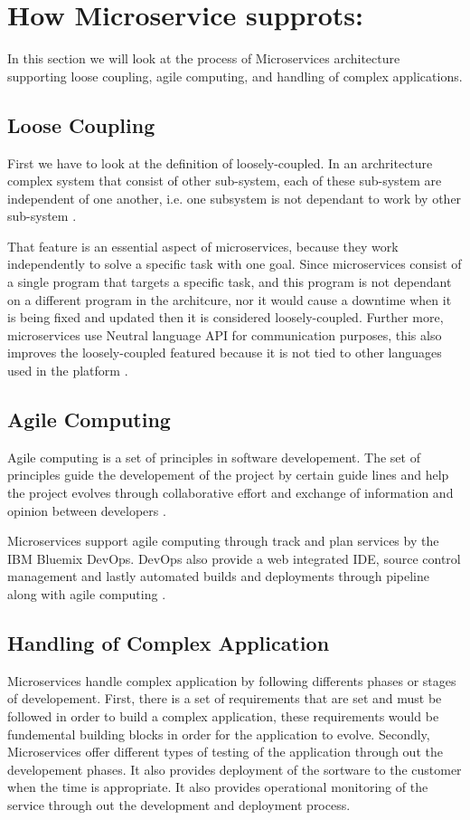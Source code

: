 \documentclass{IEEEtran}
\begin{document}
	\section{How Microservice supprots:}
		In this section we will look at the process of Microservices architecture supporting loose coupling, agile computing, and handling of complex applications.  

		\subsection{Loose Coupling}
			First we have to look at the definition of loosely-coupled. In an archritecture complex system that consist of other sub-system, each of these sub-system are independent of one another, i.e. one subsystem is not dependant to work by other sub-system \cite{mell2009effectively}. 
			\newline

			That feature is an essential aspect of microservices, because they work independently to solve a specific task with one goal. Since microservices consist of a single program that targets a specific task, and this program is not dependant on a different program in the architcure, nor it would cause a downtime when it is being fixed and updated then it is considered loosely-coupled. Further more, microservices use Neutral language API for communication purposes, this also improves the loosely-coupled featured because it is not tied to other languages used in the platform \cite{ibmred}. 
		\subsection{Agile Computing}
			Agile computing is a set of principles in software developement. The set of principles guide the developement of the project by certain guide lines and help the project evolves through collaborative effort and exchange of information and opinion between developers \cite{mell2009effectively}. 
			\newline

			Microservices support agile computing through track and plan services by the IBM Bluemix DevOps. 
			DevOps also provide a web integrated IDE, source control management and lastly automated builds and deployments through pipeline along with agile computing \cite{ibmred}. 

		\subsection{Handling of Complex Application}
			Microservices handle complex application by following differents phases or stages of developement. First, there is a set of requirements that are set and must be followed in order to build a complex application, these requirements would be fundemental building blocks in order for the application to evolve. Secondly, Microservices offer different types of testing of the application through out the developement phases. It also provides deployment of the sortware to the customer when the time is appropriate. It also provides operational monitoring of the service through out the development and deployment process. 
\end{document}
